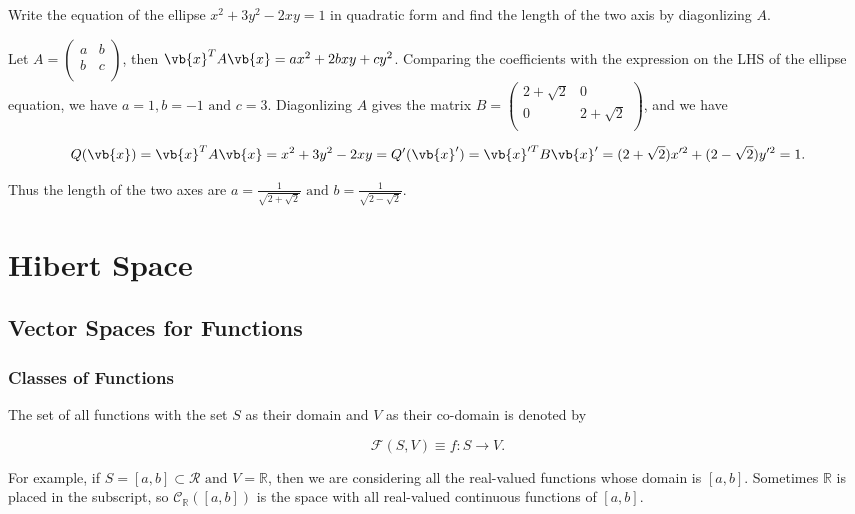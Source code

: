 \documentclass[a4paper,12pt]{report}
\begin{document}
{Write the equation of the ellipse \(x^2+3y^2-2xy=1\) in quadratic form and find the length of the two axis by diagonlizing \(A\). }
{Let \(A = \begin{pmatrix}
    a &  b \\
    b &  c \\
\end{pmatrix}\), then \(\vb{x} ^TA\vb{x} = ax^2 + 2bxy + cy^2\). Comparing the coefficients with the expression on the LHS of the ellipse equation, we have \(a = 1, b = -1 \text { and } c = 3\). Diagonlizing \(A\) gives the matrix \(B = \begin{pmatrix}
    2+\sqrt{2}  & 0  \\
    0 & 2+\sqrt{2}   \\
\end{pmatrix}\), and we have 

\begin{equation}
    Q(\vb{x} ) = \vb{x} ^TA\vb{x} = x^2+3y^2-2xy = Q'(\vb{x} ') = \vb{x} '^TB\vb{x} '= (2+\sqrt{2} )x'^2+(2-\sqrt{2} )y'^2 = 1.
\end{equation}

Thus the length of the two axes are \(a = \frac{1}{\sqrt{2+\sqrt{2 } }} \text { and } b = \frac{1}{\sqrt{2-\sqrt{2} } }  \). 
} 

\chapter{Hibert Space}

\section{Vector Spaces for Functions}

\subsection{Classes of Functions}

The set of all functions with the set \(S\) as their domain and \(V\) as their co-domain is denoted by 

\begin{equation}
    \mathcal{F}(S,V) \equiv {f:S \to V}.
\end{equation}

For example, if \(S = [a,b] \subset \mathcal{R} \text { and }  V = \mathbb{R}\), then we are considering all the real-valued functions whose domain is \([a,b]\). Sometimes \(\mathbb{R}\) is placed in the subscript, so \(\mathcal{C}_{\mathbb{R}}([a,b]) \) is the space with all real-valued continuous functions of \([a,b]\).
\end{document}
